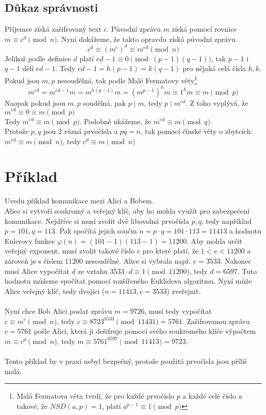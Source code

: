 \documentclass[12pt,a4paper]{report}
\begin{document}
\subsection*{Důkaz správnosti}
Příjemce získá zašifrovaný text $c$. Původní zprávu $m$ získá pomocí rovnice
$m \equiv c^d \pmod n$. Nyní dokážeme, že takto opravdu získá původní zprávu.
$$c^d \equiv (m^e)^d \equiv m^{ed} \pmod n$$
Jelikož podle definice $d$ platí $ed-1 \equiv 0 \pmod{(p-1)(q-1)}$, tak $p-1$ i $q-1$ dělí $ed-1$. Tedy $ed-1=h(p-1)=k(q-1)$ pro nějaká celá čísla $h,k$.
\\Pokud jsou $m,p$ nesoudělná, tak podle Malé Fermatovy věty\footnote{Malá Fermatova věta tvrdí, že pro každé prvočíslo $p$ a každé celé číslo $a$ takové, že $NSD(a,p)=1$, \break platí $a^{p-1} \equiv 1 \pmod p$}
$$m^{ed}=m^{ed-1}m=m^{h(p-1)}m=\left(m^{p-1}\right)^h m \equiv 1^h m \equiv m \pmod p$$
Naopak pokud jsou $m,p$ soudělná, pak $p \mid m$, tedy $p \mid m^{ed}$. Z toho vyplývá, že $m^{ed} \equiv 0 \equiv m \pmod p$
\\Tedy $m^{ed} \equiv m \pmod p$. Podobně ukážeme, že $m^{ed} \equiv m \pmod q$.
\\Protože $p,q$ jsou 2 různá prvočísla a $pq=n$, tak pomocí čínské věty o zbytcích: \\$m^{ed} \equiv m \pmod n$, tedy $c^d \equiv m \pmod n$
\section{Příklad}
Uvedu příklad komunikace mezi Alicí a Bobem. 
\\Alice si vytvoří soukromý a veřejný klíč, aby ho mohla využít pro zabezpečení
komunikace. Nejdříve si musí zvolit dvě libovolná prvočísla $p,q$, tedy například $p=101,q=113$. Pak spočítá jejich součin $n=p\cdot q=101 \cdot 113 = 11413$
a hodnotu Eulerovy funkce $\varphi(n) = (101-1)(113-1)=11200$. Aby mohla
určit veřejný exponent, musí zvolit takové číslo $e$ pro které platí, že $1 <e <11200$ a zároveň je s číslem 11200 nesoudělné. Alice si vybrala např. $e=3533$. Nakonec
musí Alice vypočítat $d$ ze vztahu $3533 \cdot d \equiv 1 \pmod {11200}$, tedy $d=6597$. Tuto hodnotu můžeme spočítat pomocí rozšířeného Euklidova algoritmu. Nyní může Alice veřejný klíč, tedy dvojici ($n =11413, e =3533$) zveřejnit.
\\\\Nyní chce Bob Alici poslat zprávu $m = 9726$, musí tedy vypočítat $c \equiv m^e \pmod n$, tedy $c\equiv 8723^{3533} \pmod{11431}=5761$. Zašifrovanou zprávu $c=5761$ pošle Alici, která ji dešifruje pomocí svého soukromého klíče výpočtem $m \equiv c^d \pmod n$, tedy $m \equiv 5761^{6597} \pmod {11413}=9723$.
\\\\Tento příklad by v praxi nebyl bezpečný, protože použitá prvočísla jsou příliš malá.
\end{document}
